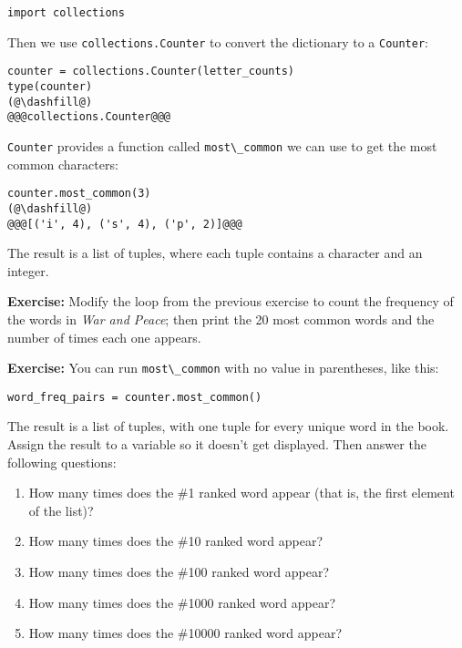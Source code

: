 \begin{lstlisting}[]
import collections
\end{lstlisting}

Then we use \passthrough{\lstinline!collections.Counter!} to convert the
dictionary to a \passthrough{\lstinline!Counter!}:

\begin{lstlisting}[]
counter = collections.Counter(letter_counts)
type(counter)
(@\dashfill@)
@@@collections.Counter@@@
\end{lstlisting}

\passthrough{\lstinline!Counter!} provides a function called
\passthrough{\lstinline!most\_common!} we can use to get the most common
characters:

\begin{lstlisting}[]
counter.most_common(3)
(@\dashfill@)
@@@[('i', 4), ('s', 4), ('p', 2)]@@@
\end{lstlisting}

The result is a list of tuples, where each tuple contains a character
and an integer.

\textbf{Exercise:} Modify the loop from the previous exercise to count
the frequency of the words in \emph{War and Peace}; then print the 20
most common words and the number of times each one appears.

\textbf{Exercise:} You can run \passthrough{\lstinline!most\_common!}
with no value in parentheses, like this:

\begin{lstlisting}
word_freq_pairs = counter.most_common()
\end{lstlisting}

The result is a list of tuples, with one tuple for every unique word in
the book. Assign the result to a variable so it doesn't get displayed.
Then answer the following questions:

\begin{enumerate}
\def\labelenumi{\arabic{enumi}.}
\item
  How many times does the \#1 ranked word appear (that is, the first
  element of the list)?
\item
  How many times does the \#10 ranked word appear?
\item
  How many times does the \#100 ranked word appear?
\item
  How many times does the \#1000 ranked word appear?
\item
  How many times does the \#10000 ranked word appear?
\end{enumerate}

